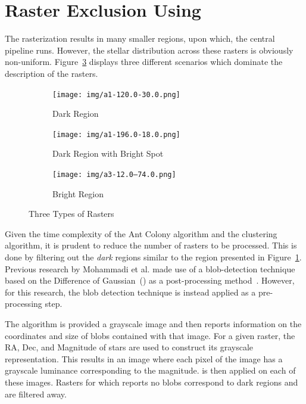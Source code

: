 \section{\label{sec:DoG}Raster Exclusion Using \blobdog{}}

The rasterization results in many smaller regions, upon which, the central
pipeline runs. However, the stellar distribution across these rasters
is obviously non-uniform. Figure~\ref{fig:raster-brightness} displays three
different scenarios which dominate the description of the rasters.

\begin{figure}[H]
    \centering
    \begin{subfigure}[b]{0.31\textwidth}
        \texttt{[image: img/a1-120.0-30.0.png]}
        \caption{\label{fig:dark-region}Dark Region}
    \end{subfigure}
    \hspace{0.02\textwidth}
    \begin{subfigure}[b]{0.31\textwidth}
        \texttt{[image: img/a1-196.0-18.0.png]}
        \caption{\label{fig:dark-region-bright-spot}Dark Region with Bright Spot}
    \end{subfigure}
    \hspace{0.02\textwidth}
    \begin{subfigure}[b]{0.31\textwidth}
        \texttt{[image: img/a3-12.0--74.0.png]}
        \caption{Bright Region}
    \end{subfigure}
    \caption{\label{fig:raster-brightness} Three Types of Rasters}
\end{figure}

Given the time complexity of the Ant Colony algorithm and the
clustering algorithm, it is prudent to reduce the number of rasters to be
processed. This is done by filtering out the \textit{dark} regions similar
to the region presented in Figure~\ref{fig:dark-region}. Previous research by Mohammadi et al. made use of a blob-detection technique based on the
Difference of Gaussian~(\blobdog{}) as a post-processing
method~\cite{Mohammadi}. However, for this research, the blob detection technique is instead applied as a pre-processing step.

The \blobdog{} algorithm is provided a grayscale image and then reports information on the coordinates and size of blobs contained with that image. For a given raster, the RA, Dec, and Magnitude of stars are used to construct its grayscale representation. This results in an image where each pixel of the image has a
grayscale luminance corresponding to the magnitude. \blobdog{} is then applied on
each of these images. Rasters for which \blobdog{} reports no blobs correspond to dark regions and are filtered away.

